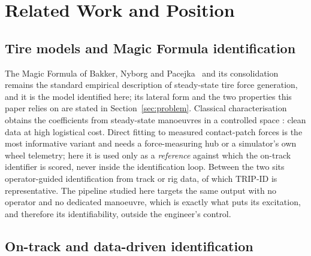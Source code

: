 \section{Related Work and Position}
\label{sec:related}

\subsection{Tire models and Magic Formula identification}

The Magic Formula of Bakker, Nyborg and Pacejka~\cite{pacejka1987sae} and its
consolidation~\cite{pacejka1992magic,pacejka2012book} remains the standard
empirical description of steady-state tire force generation, and it is the
model identified here; its lateral form and the two properties this paper
relies on are stated in Section~\ref{sec:problem}. Classical characterisation
obtains the coefficients from steady-state manoeuvres in a controlled space
\cite{ontrack2025,amz2020}: clean data at high logistical cost. Direct fitting
to measured contact-patch forces is the most informative variant and needs a
force-measuring hub or a simulator's own wheel telemetry; here it is used only
as a \emph{reference} against which the on-track identifier is scored, never
inside the identification loop. Between the two sits operator-guided
identification from track or rig data, of which TRIP-ID
\cite{farroni2018tripid} is representative. The pipeline studied here targets
the same output with no operator and no dedicated manoeuvre, which is exactly
what puts its excitation, and therefore its identifiability, outside the
engineer's control.

\subsection{On-track and data-driven identification}

